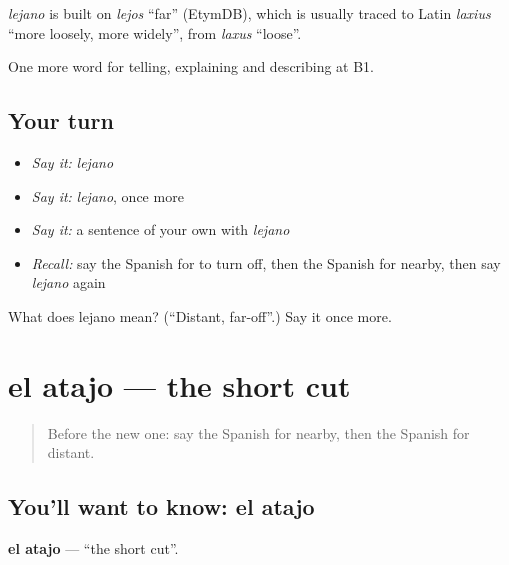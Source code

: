 \begin{cousinweb}
\emph{lejano} is built on \emph{lejos} \textquotedblleft{}far\textquotedblright{} (EtymDB), which is usually traced to Latin \emph{laxius} \textquotedblleft{}more loosely, more widely\textquotedblright{}, from \emph{laxus} \textquotedblleft{}loose\textquotedblright{}.
\end{cousinweb}

\begin{grammarlens}[title={What you've built}]
One more word for telling, explaining and describing at B1.
\end{grammarlens}

\subsection*{Your turn}
\begin{itemize}
\raggedright
  \item \emph{Say it:} \emph{lejano}
  \item \emph{Say it:} \emph{lejano}, once more
  \item \emph{Say it:} a sentence of your own with \emph{lejano}
  \item \emph{Recall:} say the Spanish for to turn off, then the Spanish for nearby, then say \emph{lejano} again
\end{itemize}

\begin{tcolorbox}[breakable,colback=teal!4,colframe=teal!35!black,title={Before you move on}]
What does lejano mean? (\textquotedblleft{}Distant, far-off\textquotedblright{}.) Say it once more.
\end{tcolorbox}
\section[el atajo]{el atajo — the short cut}

\label{lesson:ES-C671-atajo}



\begin{quote}
Before the new one: say the Spanish for nearby, then the Spanish for distant.
\end{quote}

\subsection*{You'll want to know: el atajo}
\textbf{el atajo} — \textquotedblleft{}the short cut\textquotedblright{}.

